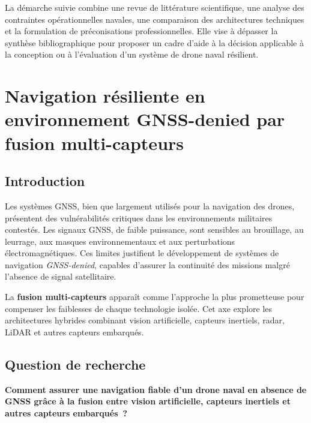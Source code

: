 \documentclass[12pt, a4paper, twoside, openright]{report}
\begin{document}
La démarche suivie combine une revue de littérature scientifique, une analyse des contraintes opérationnelles navales, une comparaison des architectures techniques et la formulation de préconisations professionnelles. Elle vise à dépasser la synthèse bibliographique pour proposer un cadre d'aide à la décision applicable à la conception ou à l'évaluation d'un système de drone naval résilient.

\cleardoublepage

\chapter{Navigation résiliente en environnement GNSS-denied par fusion multi-capteurs}\label{chap:axe1}

\section{Introduction}

Les systèmes GNSS, bien que largement utilisés pour la navigation des drones, présentent des vulnérabilités critiques dans les environnements militaires contestés. Les signaux GNSS, de faible puissance, sont sensibles au brouillage, au leurrage, aux masques environnementaux et aux perturbations électromagnétiques. Ces limites justifient le développement de systèmes de navigation \textit{GNSS-denied}, capables d'assurer la continuité des missions malgré l'absence de signal satellitaire.

La \textbf{fusion multi-capteurs} apparaît comme l'approche la plus prometteuse pour compenser les faiblesses de chaque technologie isolée. Cet axe explore les architectures hybrides combinant vision artificielle, capteurs inertiels, radar, LiDAR et autres capteurs embarqués.

\section{Question de recherche}

\begin{mdframed}[backgroundcolor=blue!5, linewidth=1.5pt, linecolor=blue]
\textbf{Comment assurer une navigation fiable d'un drone naval en absence de GNSS grâce à la fusion entre vision artificielle, capteurs inertiels et autres capteurs embarqués~?}
\end{mdframed}
\end{document}
